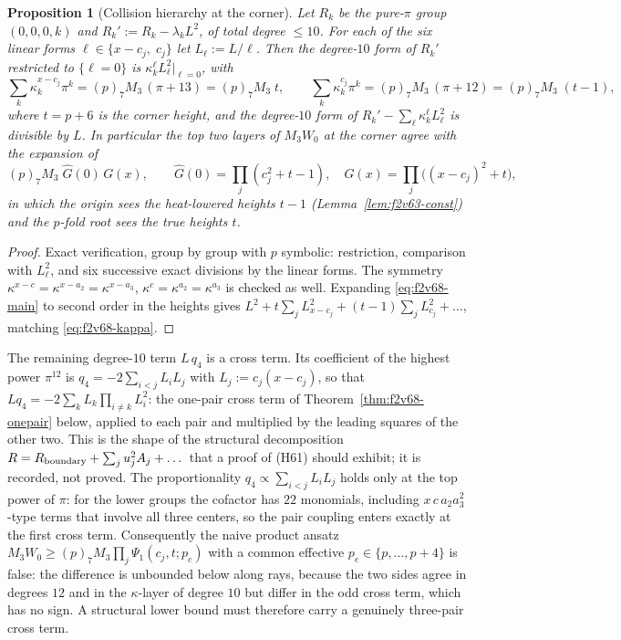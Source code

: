 \documentclass[11pt]{article}
\newtheorem{proposition}[theorem]{Proposition}
\theoremstyle{definition}
\theoremstyle{remark}
\begin{document}
\begin{proposition}[Collision hierarchy at the corner]
\label{prop:f2v68-hierarchy}
Let \(R_k\) be the pure-\(\pi\) group \((0,0,0,k)\) and
\(R_k':=R_k-\lambda_kL^2\), of total degree \(\le10\).  For each of the
six linear forms \(\ell\in\{x-c_j,\;c_j\}\) let \(L_\ell:=L/\ell\).  Then
the degree-\(10\) form of \(R_k'\) restricted to \(\{\ell=0\}\) is
\(\kappa^{\ell}_kL_\ell^2|_{\ell=0}\), with
\begin{equation}
 \sum_k\kappa^{x-c_j}_k\pi^k=(p)_7M_3\,(\pi+13)=(p)_7M_3\;t,\qquad
 \sum_k\kappa^{c_j}_k\pi^k=(p)_7M_3\,(\pi+12)=(p)_7M_3\;(t-1),
 \label{eq:f2v68-kappa}
\end{equation}
where \(t=p+6\) is the corner height, and the degree-\(10\) form of
\(R_k'-\sum_\ell\kappa_k^\ell L_\ell^2\) is divisible by \(L\).  In
particular the top two layers of \(M_3W_0\) at the corner agree with the
expansion of
\begin{equation}
 (p)_7M_3\;\widehat G(0)\,G(x),\qquad
 \widehat G(0)=\prod_j(c_j^2+t-1),\quad G(x)=\prod_j\bigl((x-c_j)^2+t\bigr),
 \label{eq:f2v68-main}
\end{equation}
in which the origin sees the heat-lowered heights \(t-1\)
(Lemma~\ref{lem:f2v63-const}) and the \(p\)-fold root sees the true
heights \(t\).
\end{proposition}

\begin{proof}
Exact verification, group by group with \(p\) symbolic: restriction,
comparison with \(L_\ell^2\), and six successive exact divisions by the
linear forms.  The symmetry \(\kappa^{x-c}=\kappa^{x-a_2}=\kappa^{x-a_3}\),
\(\kappa^{c}=\kappa^{a_2}=\kappa^{a_3}\) is checked as well.  Expanding
\eqref{eq:f2v68-main} to second order in the heights gives
\(L^2+t\sum_j L_{x-c_j}^2+(t-1)\sum_jL_{c_j}^2+\dots\), matching
\eqref{eq:f2v68-kappa}.
\end{proof}

The remaining degree-\(10\) term \(L\,q_4\) is a cross term.  Its
coefficient of the highest power \(\pi^{12}\) is
\(q_4=-2\sum_{i<j}L_iL_j\) with \(L_j:=c_j(x-c_j)\), so that
\(Lq_4=-2\sum_kL_k\prod_{i\ne k}L_i^2\): the one-pair cross term of
Theorem~\ref{thm:f2v68-onepair} below, applied to each pair and
multiplied by the leading squares of the other two.  This is the shape
of the structural decomposition
\(R=R_{\rm boundary}+\sum_ju_j^2A_j+\dots\) that a proof of (H61)
should exhibit; it is recorded, not proved.  The proportionality
\(q_4\propto\sum_{i<j}L_iL_j\) holds only at the top power of \(\pi\):
for the lower groups the cofactor has \(22\) monomials, including
\(x\,c\,a_2a_3^2\)-type terms that involve all three centers, so the
pair coupling enters exactly at the first cross term.  Consequently the
naive product ansatz \(M_3W_0\ge(p)_7M_3\prod_j\Psi_1(c_j,t;p_e)\)
with a common effective \(p_e\in\{p,\dots,p+4\}\) is false: the
difference is unbounded below along rays, because the two sides agree in
degrees \(12\) and in the \(\kappa\)-layer of degree \(10\) but differ
in the odd cross term, which has no sign.  A structural lower bound must
therefore carry a genuinely three-pair cross term.
\end{document}

